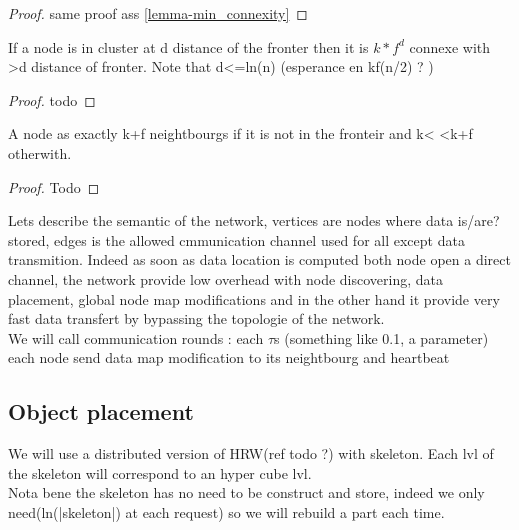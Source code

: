  \begin{proof}
 same proof ass \ref{lemma-min_connexity}
\end{proof}

\begin{lemma}
 If a node is in cluster at d distance of the fronter then it is $k*f^{d}$ connexe with >d distance of fronter.
 Note that d<=ln(n) (esperance en kf(n/2) ? )
\end{lemma}

\begin{proof}
 todo
\end{proof}

\begin{lemma}
 A node as exactly k+f neightbourgs if it is not in the fronteir and k< <k+f otherwith.
\end{lemma}

\begin{proof}
 Todo
\end{proof}


Lets describe the semantic of the network, vertices are nodes where data is/are? stored, edges is the allowed cmmunication 
channel used for all except data transmition. Indeed as soon as data location is computed both node open a direct channel, the network provide low overhead 
with node discovering, data placement, global node map modifications and in the other hand it provide very fast data transfert by bypassing the topologie of the network.
\\
We will call communication rounds : each $\tau$s (something like 0.1, a parameter) each node send data map modification to its neightbourg and heartbeat

\subsection{Object placement}
\begin{minipage}{0.49\textwidth}
   \centering
   \scalebox{0.1}{
     
   }
\end{minipage}
\begin{minipage}{0.49\textwidth}
We will use a distributed version of HRW(ref todo ?) with skeleton. Each lvl of the skeleton will correspond to an hyper cube lvl.\\
Nota bene the skeleton has no need to  be construct and store, indeed we only need(ln(|skeleton|) at each request) so we will rebuild a part each time.
\end{minipage}\\


